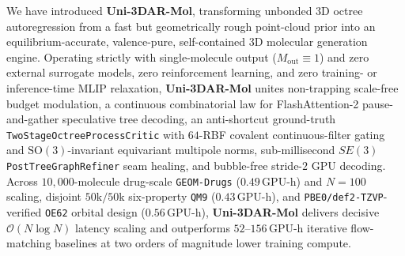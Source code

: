 \documentclass[11pt,a4paper]{article}
\begin{document}
We have introduced \textbf{Uni-3DAR-Mol}, transforming unbonded 3D octree autoregression from a fast but geometrically rough point-cloud prior into an equilibrium-accurate, valence-pure, self-contained 3D molecular generation engine. Operating strictly with single-molecule output ($M_{\text{out}} \equiv 1$) and zero external surrogate models, zero reinforcement learning, and zero training- or inference-time MLIP relaxation, \textbf{Uni-3DAR-Mol} unites non-trapping scale-free budget modulation, a continuous combinatorial law for FlashAttention-2 pause-and-gather speculative tree decoding, an anti-shortcut ground-truth \texttt{TwoStage\allowbreak Octree\allowbreak ProcessCritic} with $64$-RBF covalent continuous-filter gating and $\text{SO}(3)$-invariant equivariant multipole norms, sub-millisecond $SE(3)$ \texttt{PostTree\allowbreak Graph\allowbreak Refiner} seam healing, and bubble-free stride-$2$ GPU decoding. Across $10{,}000$-molecule drug-scale \texttt{GEOM-Drugs} ($0.49\,\text{GPU-h}$) and $N=100$ scaling, disjoint $50\text{k}/50\text{k}$ six-property \texttt{QM9} ($0.43\,\text{GPU-h}$), and \texttt{PBE0/def2-TZVP}-verified \texttt{OE62} orbital design ($0.56\,\text{GPU-h}$), \textbf{Uni-3DAR-Mol} delivers decisive $\mathcal{O}(N \log N)$ latency scaling and outperforms $52\text{--}156\,\text{GPU-h}$ iterative flow-matching baselines at two orders of magnitude lower training compute.



\end{document}
